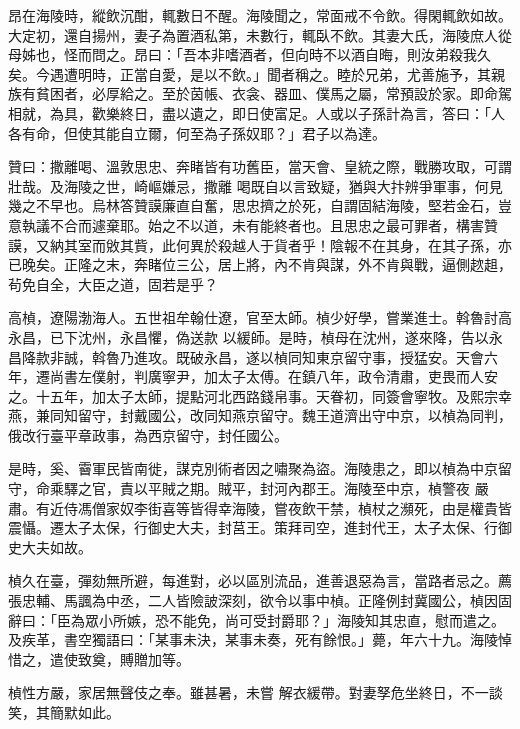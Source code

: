 \begin{pinyinscope}
 昂在海陵時，縱飲沉酣，輒數日不醒。海陵聞之，常面戒不令飲。得閑輒飲如故。
 大定初，還自揚州，妻子為置酒私第，未數行，輒臥不飲。其妻大氏，海陵庶人從母姊也，怪而問之。昂曰：「吾本非嗜酒者，但向時不以酒自晦，則汝弟殺我久矣。今遇遭明時，正當自愛，是以不飲。」聞者稱之。睦於兄弟，尤善施予，其親族有貧困者，必厚給之。至於茵帳、衣衾、器皿、僕馬之屬，常預設於家。即命駕相就，為具，歡樂終日，盡以遺之，即日使富足。人或以子孫計為言，答曰：「人各有命，但使其能自立爾，何至為子孫奴耶？」君子以為達。



 贊曰：撒離喝、溫敦思忠、奔睹皆有功舊臣，當天會、皇統之際，戰勝攻取，可謂壯哉。及海陵之世，崎嶇嫌忌，撒離
 喝既自以言致疑，猶與大抃辨爭軍事，何見幾之不早也。烏林答贊謨廉直自奮，思忠擠之於死，自謂固結海陵，堅若金石，豈意執議不合而遽棄耶。始之不以道，未有能終者也。且思忠之最可罪者，構害贊謨，又納其室而敓其貲，此何異於殺越人于貨者乎！陰報不在其身，在其子孫，亦已晚矣。正隆之末，奔睹位三公，居上將，內不肯與謀，外不肯與戰，逼側趑趄，茍免自全，大臣之道，固若是乎？



 高楨，遼陽渤海人。五世祖牟翰仕遼，官至太師。楨少好學，嘗業進士。斡魯討高永昌，已下沈州，永昌懼，偽送款
 以緩師。是時，楨母在沈州，遂來降，告以永昌降款非誠，斡魯乃進攻。既破永昌，遂以楨同知東京留守事，授猛安。天會六年，遷尚書左僕射，判廣寧尹，加太子太傅。在鎮八年，政令清肅，吏畏而人安之。十五年，加太子太師，提點河北西路錢帛事。天眷初，同簽會寧牧。及熙宗幸燕，兼同知留守，封戴國公，改同知燕京留守。魏王道濟出守中京，以楨為同判，俄改行臺平章政事，為西京留守，封任國公。



 是時，奚、霫軍民皆南徙，謀克別術者因之嘯聚為盜。海陵患之，即以楨為中京留守，命乘驛之官，責以平賊之期。賊平，封河內郡王。海陵至中京，楨警夜
 嚴肅。有近侍馮僧家奴李街喜等皆得幸海陵，嘗夜飲干禁，楨杖之瀕死，由是權貴皆震懾。遷太子太保，行御史大夫，封莒王。策拜司空，進封代王，太子太保、行御史大夫如故。



 楨久在臺，彈劾無所避，每進對，必以區別流品，進善退惡為言，當路者忌之。薦張忠輔、馬諷為中丞，二人皆險詖深刻，欲令以事中楨。正隆例封冀國公，楨因固辭曰：「臣為眾小所嫉，恐不能免，尚可受封爵耶？」海陵知其忠直，慰而遣之。及疾革，書空獨語曰：「某事未決，某事未奏，死有餘恨。」薨，年六十九。海陵悼惜之，遣使致奠，賻贈加等。



 楨性方嚴，家居無聲伎之奉。雖甚暑，未嘗
 解衣緩帶。對妻孥危坐終日，不一談笑，其簡默如此。




\end{pinyinscope}

